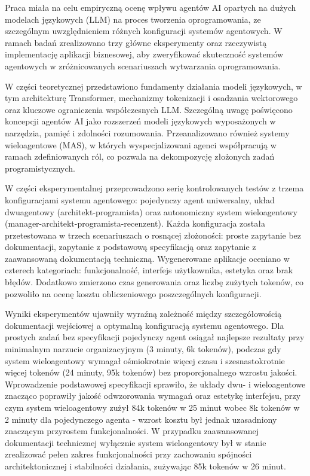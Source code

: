 \documentclass[
    left=2.5cm,         %
    right=2.5cm,        %
    top=2.5cm,          %
    bottom=3cm,         %
    bindingoffset=6mm,  %
    nohyphenation=false %
]{ee/ee-thesis}
\begin{document}
Praca miała na celu empiryczną ocenę wpływu agentów AI opartych na dużych modelach językowych (LLM) na proces tworzenia oprogramowania, ze szczególnym uwzględnieniem różnych konfiguracji systemów agentowych. W ramach badań zrealizowano trzy główne eksperymenty oraz rzeczywistą implementację aplikacji biznesowej, aby zweryfikować skuteczność systemów agentowych w zróżnicowanych scenariuszach wytwarzania oprogramowania.

W części teoretycznej przedstawiono fundamenty działania modeli językowych, w tym architekturę Transformer, mechanizmy tokenizacji i osadzania wektorowego oraz kluczowe ograniczenia współczesnych LLM. Szczególną uwagę poświęcono koncepcji agentów AI jako rozszerzeń modeli językowych wyposażonych w narzędzia, pamięć i zdolności rozumowania. Przeanalizowano również systemy wieloagentowe (MAS), w których wyspecjalizowani agenci współpracują w ramach zdefiniowanych ról, co pozwala na dekompozycję złożonych zadań programistycznych.

W części eksperymentalnej przeprowadzono serię kontrolowanych testów z trzema konfiguracjami systemu agentowego: pojedynczy agent uniwersalny, układ dwuagentowy (architekt-programista) oraz autonomiczny system wieloagentowy (manager-architekt-programista-recenzent). Każda konfiguracja została przetestowana w trzech scenariuszach o rosnącej złożoności: proste zapytanie bez dokumentacji, zapytanie z podstawową specyfikacją oraz zapytanie z zaawansowaną dokumentacją techniczną. Wygenerowane aplikacje oceniano w czterech kategoriach: funkcjonalność, interfejs użytkownika, estetyka oraz brak błędów. Dodatkowo zmierzono czas generowania oraz liczbę zużytych tokenów, co pozwoliło na ocenę kosztu obliczeniowego poszczególnych konfiguracji.

Wyniki eksperymentów ujawniły wyraźną zależność między szczegółowością dokumentacji wejściowej a optymalną konfiguracją systemu agentowego. Dla prostych zadań bez specyfikacji pojedynczy agent osiągał najlepsze rezultaty przy minimalnym narzucie organizacyjnym (3 minuty, 6k tokenów), podczas gdy system wieloagentowy wymagał ośmiokrotnie więcej czasu i szesnastokrotnie więcej tokenów (24 minuty, 95k tokenów) bez proporcjonalnego wzrostu jakości. Wprowadzenie podstawowej specyfikacji sprawiło, że układy dwu- i wieloagentowe znacząco poprawiły jakość odwzorowania wymagań oraz estetykę interfejsu, przy czym system wieloagentowy zużył 84k tokenów w 25 minut wobec 8k tokenów w 2 minuty dla pojedynczego agenta - wzrost kosztu był jednak uzasadniony znaczącym przyrostem funkcjonalności. W przypadku zaawansowanej dokumentacji technicznej wyłącznie system wieloagentowy był w stanie zrealizować pełen zakres funkcjonalności przy zachowaniu spójności architektonicznej i stabilności działania, zużywając 85k tokenów w 26 minut.
\end{document}
